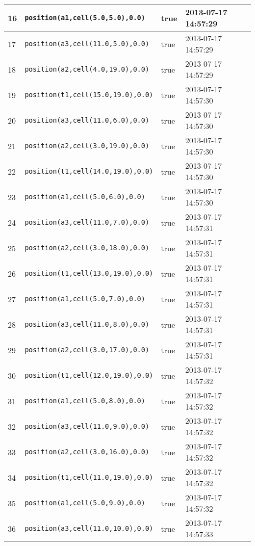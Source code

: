 \documentclass[11pt]{article}\usepackage[utf8]{inputenc}\usepackage{geometry}
\begin{document}
\begin{table}[ht]
\begin{tabular}{l l l l}
16&\texttt{position(a1,cell(5.0,5.0),0.0)}&true&2013-07-17 14:57:29\\ [1ex] \hline
17&\texttt{position(a3,cell(11.0,5.0),0.0)}&true&2013-07-17 14:57:29\\ [1ex] \hline
18&\texttt{position(a2,cell(4.0,19.0),0.0)}&true&2013-07-17 14:57:29\\ [1ex] \hline
19&\texttt{position(t1,cell(15.0,19.0),0.0)}&true&2013-07-17 14:57:30\\ [1ex] \hline
20&\texttt{position(a3,cell(11.0,6.0),0.0)}&true&2013-07-17 14:57:30\\ [1ex] \hline
21&\texttt{position(a2,cell(3.0,19.0),0.0)}&true&2013-07-17 14:57:30\\ [1ex] \hline
22&\texttt{position(t1,cell(14.0,19.0),0.0)}&true&2013-07-17 14:57:30\\ [1ex] \hline
23&\texttt{position(a1,cell(5.0,6.0),0.0)}&true&2013-07-17 14:57:30\\ [1ex] \hline
24&\texttt{position(a3,cell(11.0,7.0),0.0)}&true&2013-07-17 14:57:31\\ [1ex] \hline
25&\texttt{position(a2,cell(3.0,18.0),0.0)}&true&2013-07-17 14:57:31\\ [1ex] \hline
26&\texttt{position(t1,cell(13.0,19.0),0.0)}&true&2013-07-17 14:57:31\\ [1ex] \hline
27&\texttt{position(a1,cell(5.0,7.0),0.0)}&true&2013-07-17 14:57:31\\ [1ex] \hline
28&\texttt{position(a3,cell(11.0,8.0),0.0)}&true&2013-07-17 14:57:31\\ [1ex] \hline
29&\texttt{position(a2,cell(3.0,17.0),0.0)}&true&2013-07-17 14:57:31\\ [1ex] \hline
30&\texttt{position(t1,cell(12.0,19.0),0.0)}&true&2013-07-17 14:57:32\\ [1ex] \hline
31&\texttt{position(a1,cell(5.0,8.0),0.0)}&true&2013-07-17 14:57:32\\ [1ex] \hline
32&\texttt{position(a3,cell(11.0,9.0),0.0)}&true&2013-07-17 14:57:32\\ [1ex] \hline
33&\texttt{position(a2,cell(3.0,16.0),0.0)}&true&2013-07-17 14:57:32\\ [1ex] \hline
34&\texttt{position(t1,cell(11.0,19.0),0.0)}&true&2013-07-17 14:57:32\\ [1ex] \hline
35&\texttt{position(a1,cell(5.0,9.0),0.0)}&true&2013-07-17 14:57:32\\ [1ex] \hline
36&\texttt{position(a3,cell(11.0,10.0),0.0)}&true&2013-07-17 14:57:33\\ [1ex] \hline

\end{tabular}
\end{table}
\end{document}
